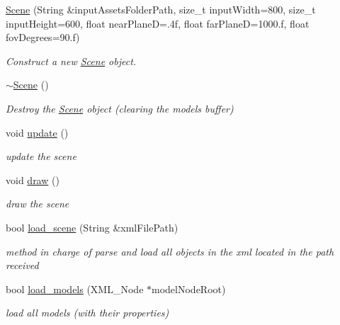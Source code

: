 \begin{DoxyCompactItemize}
\item 
\mbox{\hyperlink{classprzurro_1_1_scene_aac84c8cfd0f26b897805f8af37dccd22}{Scene}} (String \&input\+Assets\+Folder\+Path, size\+\_\+t input\+Width=800, size\+\_\+t input\+Height=600, float near\+PlaneD=.\+4f, float far\+Plane\+D=1000.\+f, float fov\+Degrees=90.\+f)
\begin{DoxyCompactList}\small\item\em Construct a new \mbox{\hyperlink{classprzurro_1_1_scene}{Scene}} object. \end{DoxyCompactList}\item 
\mbox{\hyperlink{classprzurro_1_1_scene_a3d68ff36908d9cacac34f720f971397b}{$\sim$\+Scene}} ()
\begin{DoxyCompactList}\small\item\em Destroy the \mbox{\hyperlink{classprzurro_1_1_scene}{Scene}} object (clearing the models buffer) \end{DoxyCompactList}\item 
void \mbox{\hyperlink{classprzurro_1_1_scene_aeead0368cdf439e638de159ea00fce8e}{update}} ()
\begin{DoxyCompactList}\small\item\em update the scene \end{DoxyCompactList}\item 
void \mbox{\hyperlink{classprzurro_1_1_scene_a8f6186a7e9ee5e998c9d3051291026ed}{draw}} ()
\begin{DoxyCompactList}\small\item\em draw the scene \end{DoxyCompactList}\item 
bool \mbox{\hyperlink{classprzurro_1_1_scene_a06f84762709af4ba3b920b01f2ae6cdf}{load\+\_\+scene}} (String \&xml\+File\+Path)
\begin{DoxyCompactList}\small\item\em method in charge of parse and load all objects in the xml located in the path received \end{DoxyCompactList}\item 
bool \mbox{\hyperlink{classprzurro_1_1_scene_a50cf7c0482f02880a64bfa7c270f61ca}{load\+\_\+models}} (X\+M\+L\+\_\+\+Node $\ast$model\+Node\+Root)
\begin{DoxyCompactList}\small\item\em load all models (with their properties) \end{DoxyCompactList}\item 

\end{DoxyCompactItemize}
